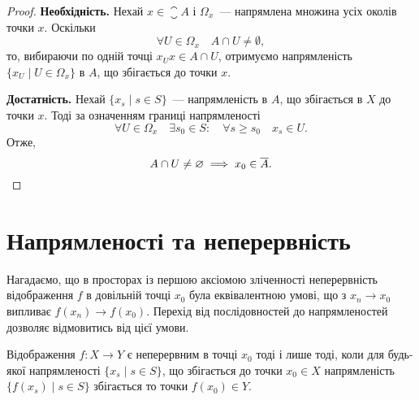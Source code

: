 \begin{proof}
    \textbf{Необхідність.} Нехай $x \in \closure A$ і $\Omega_x$~--- напрямлена множина усіх околів точки $x$. Оскільки
    \begin{equation*}
        \forall U \in \Omega_x \quad A \cap U \ne \emptyset,
    \end{equation*}
    то, вибираючи по одній точці $x_U x \in A \cap U$, отримуємо напрямленість $\{x_U \mid U \in \Omega_x\}$ в $A$, що збігається до точки $x$. 

    \textbf{Достатність.} Нехай $\{x_s \mid s \in S\}$~--- напрямленість в $A$, що збігається в $X$ до точки $x$. Тоді за означенням границі напрямленості
    \begin{equation*}
        \forall U \in \Omega_x \quad \exists s_0 \in S: \quad \forall s \ge s_0 \quad x_s \in U.
    \end{equation*}
    Отже,
    \begin{equation*}
        A \cap U \ne \varnothing \implies x_0 \in \overline{A}. \qedhere
    \end{equation*}
\end{proof}

\section{Напрямленості та неперервність}

\begin{remark}
    Нагадаємо, що в просторах із першою аксіомою зліченності неперервність відображення $f$ в довільній точці $x_0$ була еквівалентною умові, що з $x_n \to x_0$ випливає $f(x_n) \to f(x_0)$. Перехід від послідовностей до напрямленостей дозволяє відмовитись від цієї умови.
\end{remark}

\begin{theorem}
    \label{th:net-continuity-criterion}
    Відображення $f: X \to Y$ є неперервним в точці $x_0$ тоді і лише тоді, коли для будь-якої напрямленості $\{x_s \mid s \in S\}$, що збігається до точки $x_0 \in X$ напрямленість $\{f(x_s) \mid s \in S\}$ збігається то точки $f(x_0) \in Y$.
\end{theorem}

